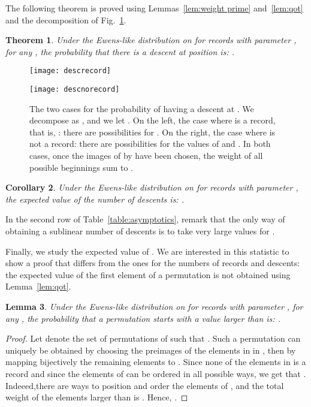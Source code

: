 \documentclass[proceedings]{aofa}
\newtheorem{theorem}{Theorem}
\newtheorem{lemma}[theorem]{Lemma}
\newtheorem{corollary}[theorem]{Corollary}
\begin{document}
The following theorem is proved using Lemmas~\ref{lem:weight prime} and~\ref{lem:qot} and the decomposition of Fig.~\ref{fig:desc}.
\begin{theorem}\label{lem:descent i}
Under the Ewens-like distribution on  for records with parameter , 
for any , 
the probability that there is a descent at position  is: 
. 
\end{theorem}
\begin{figure}[ht]
\begin{minipage}{.49\textwidth}
\texttt{[image: descrecord]}
\end{minipage}
\begin{minipage}{.49\textwidth}
\texttt{[image: descnorecord]}
\end{minipage}
\caption{The two cases for the probability of having a descent at . 
We decompose  as , and we let .
On the left, the case where  is a record, that is, : there are  possibilities for . 
On the right, the case where  is not a record: there are  possibilities for the values of  and . 
In both cases, once the images of  by  have been chosen, the weight of all possible beginnings sum to .\label{fig:desc}}
\end{figure}

\begin{corollary}\label{thm:nb_of_descents}
Under the Ewens-like distribution on  for records with parameter , the expected value of the number of descents is: 
.
\end{corollary}
In the second row of Table~\ref{table:asymptotics}, remark that the only way of obtaining a sublinear number of descents is to take very large values for .


\medskip

Finally, we study the expected value of . 
We are interested in this statistic to show a proof that differs from the ones for
the numbers of records and descents: the expected value of the first element of a permutation is not obtained using Lemma~\ref{lem:qot}. 

\begin{lemma}\label{lem:first_value>k}
Under the Ewens-like distribution on  for records with parameter , 
for any , 
the probability that a permutation starts with a value larger than  is: 
. 
\end{lemma}

\begin{proof}
Let  denote the set of permutations of  such that . 
Such a permutation can uniquely be obtained by choosing the preimages of the elements in 
in , then by mapping bijectively the remaining elements to
. Since none of the elements in  is a record and since
the elements of  can be ordered in all possible ways, we get
that . Indeeed,there are
 ways to position and order the elements of , and the total weight of the elements larger than  is .
Hence, .
\end{proof}
\end{document}
